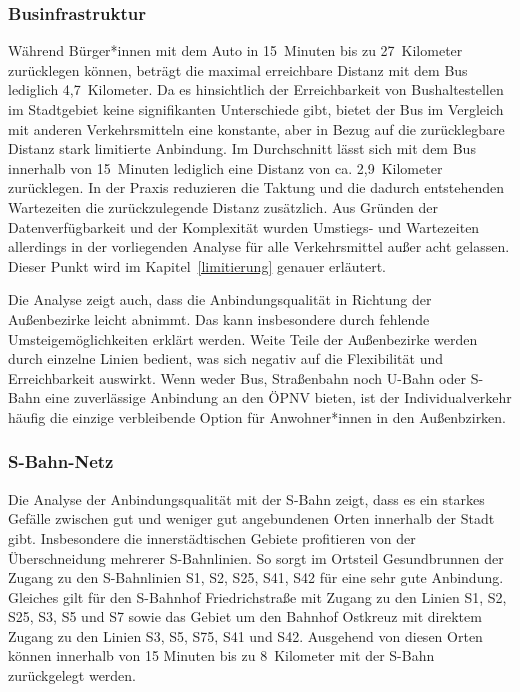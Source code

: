 \subsubsection{Businfrastruktur}

Während Bürger*innen mit dem Auto in 15~Minuten bis zu 27~Kilometer zurücklegen können, beträgt die maximal erreichbare Distanz mit dem Bus lediglich 4,7~Kilometer. Da es hinsichtlich der Erreichbarkeit von Bushaltestellen im Stadtgebiet keine signifikanten Unterschiede gibt, bietet der Bus im Vergleich mit anderen Verkehrsmitteln eine konstante, aber in Bezug auf die zurücklegbare Distanz stark limitierte Anbindung. Im Durchschnitt lässt sich mit dem Bus innerhalb von 15~Minuten lediglich eine Distanz von ca. 2,9~Kilometer zurücklegen. In der Praxis reduzieren die Taktung und die dadurch entstehenden Wartezeiten die zurückzulegende Distanz zusätzlich. Aus Gründen der Datenverfügbarkeit und der Komplexität wurden  Umstiegs- und Wartezeiten allerdings in der vorliegenden Analyse für alle Verkehrsmittel außer acht gelassen. Dieser Punkt wird im Kapitel~\ref{limitierung} genauer erläutert.


Die Analyse zeigt auch, dass die Anbindungsqualität in Richtung der Außenbezirke leicht abnimmt. Das kann insbesondere durch fehlende Umsteigemöglichkeiten erklärt werden. Weite Teile der Außenbezirke werden durch einzelne Linien bedient, was sich negativ auf die Flexibilität und Erreichbarkeit auswirkt. Wenn weder Bus, Straßenbahn noch U-Bahn oder S-Bahn eine zuverlässige Anbindung an den ÖPNV bieten, ist der Individualverkehr häufig die einzige verbleibende Option für Anwohner*innen in den Außenbzirken.

\subsubsection{S-Bahn-Netz}

Die Analyse der Anbindungsqualität mit der S-Bahn zeigt, dass es ein starkes Gefälle zwischen gut und weniger gut angebundenen Orten innerhalb der Stadt gibt. Insbesondere die innerstädtischen Gebiete profitieren von der Überschneidung mehrerer S-Bahnlinien. So sorgt im Ortsteil Gesundbrunnen der Zugang zu den S-Bahnlinien S1, S2, S25, S41, S42 für eine sehr gute Anbindung. Gleiches gilt für den S-Bahnhof Friedrichstraße mit Zugang zu den Linien S1, S2, S25, S3, S5 und S7 sowie das Gebiet um den Bahnhof Ostkreuz mit direktem Zugang zu den Linien S3, S5, S75, S41 und S42. Ausgehend von diesen Orten können innerhalb von 15 Minuten bis zu 8~Kilometer mit der S-Bahn zurückgelegt werden.

